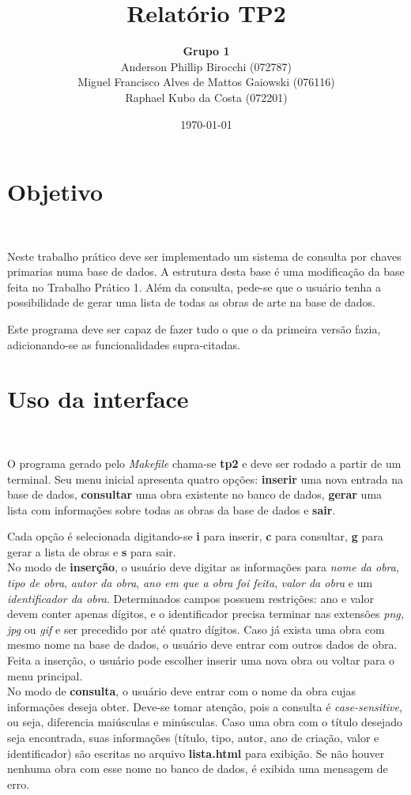 \documentclass{article}
\title{\textbf{Relatório TP2}}
\author{\textbf{Grupo 1} \\
  Anderson Phillip Birocchi (072787) \\
  Miguel Francisco Alves de Mattos Gaiowski (076116) \\
  Raphael Kubo da Costa (072201)}
\date{\today}
\begin{document}
\maketitle

\section{Objetivo}\

Neste trabalho prático deve ser implementado um sistema de consulta por chaves primarias numa base de dados. A estrutura desta base é uma modificação da base feita no Trabalho Prático 1. Além da consulta, pede-se que o usuário tenha a possibilidade de gerar uma lista de todas as obras de arte na base de dados.

Este programa deve ser capaz de fazer tudo o que o da primeira versão fazia, adicionando-se as funcionalidades supra-citadas.

\section{Uso da interface}\

O programa gerado pelo \textit{Makefile} chama-se \textbf{tp2} e deve ser rodado a partir de um terminal. Seu menu inicial apresenta quatro opções: \textbf{inserir} uma nova entrada na base de dados, \textbf{consultar} uma obra existente no banco de dados, \textbf{gerar} uma lista com informações sobre todas as obras da base de dados e \textbf{sair}.

Cada opção é selecionada digitando-se \textbf{i} para inserir, \textbf{c} para consultar, \textbf{g} para gerar a lista de obras e \textbf{s} para sair.\\

No modo de \textbf{inserção}, o usuário deve digitar as informações para \textit{nome da obra}, \textit{tipo de obra}, \textit{autor da obra}, \textit{ano em que a obra foi feita}, \textit{valor da obra} e um \textit{identificador da obra}. Determinados campos possuem restrições: ano e valor devem conter apenas dígitos, e o identificador precisa terminar nas extensões \textit{png, jpg} ou \textit{gif} e ser precedido por até quatro dígitos. Caso já exista uma obra com mesmo nome na base de dados, o usuário deve entrar com outros dados de obra. Feita a inserção, o usuário pode escolher inserir uma nova obra ou voltar para o menu principal.\\

No modo de \textbf{consulta}, o usuário deve entrar com o nome da obra cujas informações deseja obter. Deve-se tomar atenção, pois a consulta é \textit{case-sensitive}, ou seja, diferencia maiúsculas e minúsculas. Caso uma obra com o título desejado seja encontrada, suas informações (título, tipo, autor, ano de criação, valor e identificador) são escritas no arquivo \textbf{lista.html} para exibição. Se não houver nenhuma obra com esse nome no banco de dados, é exibida uma mensagem de erro.\\
\end{document}
